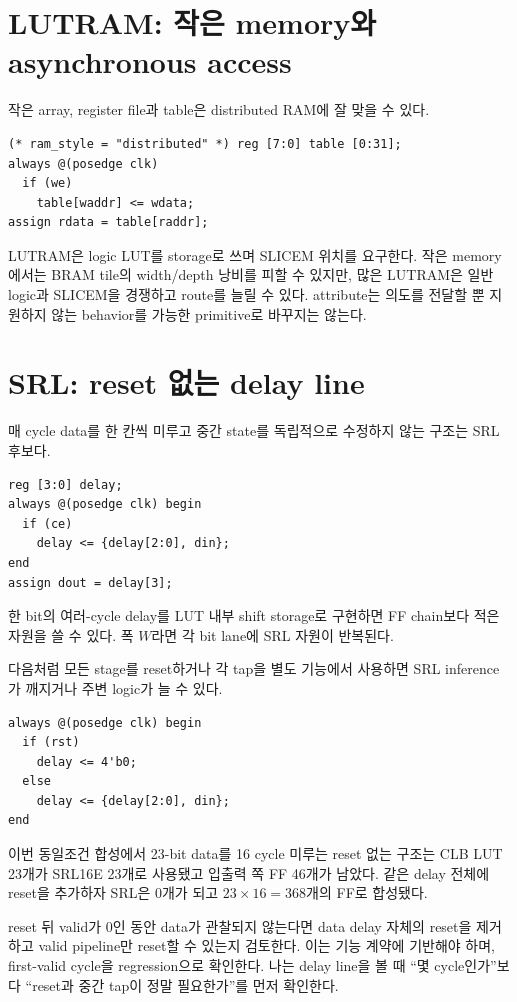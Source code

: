 \section{LUTRAM: 작은 memory와 asynchronous access}

작은 array, register file과 table은 distributed RAM에 잘 맞을 수 있다.

\begin{lstlisting}
(* ram_style = "distributed" *) reg [7:0] table [0:31];
always @(posedge clk)
  if (we)
    table[waddr] <= wdata;
assign rdata = table[raddr];
\end{lstlisting}

LUTRAM은 logic LUT를 storage로 쓰며 SLICEM 위치를 요구한다. 작은 memory에서는
BRAM tile의 width/depth 낭비를 피할 수 있지만, 많은 LUTRAM은 일반 logic과
SLICEM을 경쟁하고 route를 늘릴 수 있다. attribute는 의도를 전달할 뿐 지원하지
않는 behavior를 가능한 primitive로 바꾸지는 않는다.

\section{SRL: reset 없는 delay line}

매 cycle data를 한 칸씩 미루고 중간 state를 독립적으로 수정하지 않는 구조는
SRL 후보다.

\begin{lstlisting}
reg [3:0] delay;
always @(posedge clk) begin
  if (ce)
    delay <= {delay[2:0], din};
end
assign dout = delay[3];
\end{lstlisting}

한 bit의 여러-cycle delay를 LUT 내부 shift storage로 구현하면 FF chain보다 적은
자원을 쓸 수 있다. 폭 $W$라면 각 bit lane에 SRL 자원이 반복된다.

다음처럼 모든 stage를 reset하거나 각 tap을 별도 기능에서 사용하면 SRL inference가
깨지거나 주변 logic가 늘 수 있다.

\begin{lstlisting}
always @(posedge clk) begin
  if (rst)
    delay <= 4'b0;
  else
    delay <= {delay[2:0], din};
end
\end{lstlisting}

이번 동일조건 합성에서 23-bit data를 16 cycle 미루는 reset 없는 구조는 CLB LUT
23개가 SRL16E 23개로 사용됐고 입출력 쪽 FF 46개가 남았다. 같은 delay 전체에
reset을 추가하자 SRL은 0개가 되고 $23\times16=368$개의 FF로 합성됐다.

reset 뒤 valid가 0인 동안 data가 관찰되지 않는다면 data delay 자체의 reset을
제거하고 valid pipeline만 reset할 수 있는지 검토한다. 이는 기능 계약에 기반해야
하며, first-valid cycle을 regression으로 확인한다. 나는 delay line을 볼 때
``몇 cycle인가''보다 ``reset과 중간 tap이 정말 필요한가''를 먼저 확인한다.

